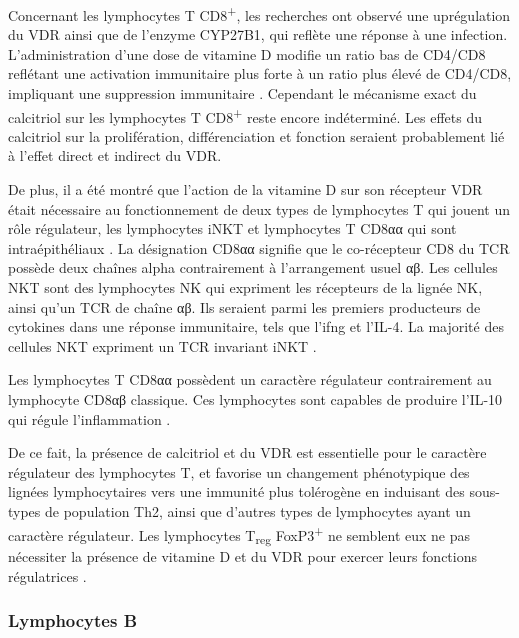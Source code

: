 \documentclass[
  a4paper,
  DIV=11,
  numbers=noendperiod,
  listof=totoc]{scrreprt}
\begin{document}
Concernant les lymphocytes T CD8\textsuperscript{+}, les recherches ont
observé une uprégulation du VDR ainsi que de l'enzyme CYP27B1, qui
reflète une réponse à une infection. L'administration d'une dose de
vitamine D modifie un ratio bas de CD4/CD8 reflétant une activation
immunitaire plus forte à un ratio plus élevé de CD4/CD8, impliquant une
suppression immunitaire \autocite{Charoenngam.2020}. Cependant le
mécanisme exact du calcitriol sur les lymphocytes T
CD8\textsuperscript{+} reste encore indéterminé. Les effets du
calcitriol sur la prolifération, différenciation et fonction seraient
probablement lié à l'effet direct et indirect du VDR.

De plus, il a été montré que l'action de la vitamine D sur son récepteur
VDR était nécessaire au fonctionnement de deux types de lymphocytes T
qui jouent un rôle régulateur, les lymphocytes \ac{iNKT} et lymphocytes
T CD8αα qui sont intraépithéliaux \autocite{Cheroutre.2008}. La
désignation CD8αα signifie que le co-récepteur CD8 du \ac{TCR} possède
deux chaînes alpha contrairement à l'arrangement usuel αβ. Les cellules
NKT sont des lymphocytes NK qui expriment les récepteurs de la lignée
NK, ainsi qu'un \ac{TCR} de chaîne αβ. Ils seraient parmi les premiers
producteurs de cytokines dans une réponse immunitaire, tels que
l'\ac{ifng} et l'\ac{IL-4}. La majorité des cellules NKT expriment un
TCR invariant \acs{iNKT} \autocite{Cantorna.2010}.

Les lymphocytes T CD8αα possèdent un caractère régulateur contrairement
au lymphocyte CD8αβ classique. Ces lymphocytes sont capables de produire
l'\ac{IL-10} qui régule l'inflammation \autocite{Cantorna.2010}.

De ce fait, la présence de calcitriol et du \ac{VDR} est essentielle
pour le caractère régulateur des lymphocytes T, et favorise un
changement phénotypique des lignées lymphocytaires vers une immunité
plus tolérogène en induisant des sous-types de population Th2, ainsi que
d'autres types de lymphocytes ayant un caractère régulateur. Les
lymphocytes T\textsubscript{reg} FoxP3\textsuperscript{+} ne semblent
eux ne pas nécessiter la présence de vitamine D et du \ac{VDR} pour
exercer leurs fonctions régulatrices \autocite{Cantorna.2010}.

\subsubsection{Lymphocytes B}\label{lymphocytes-b}
\end{document}
